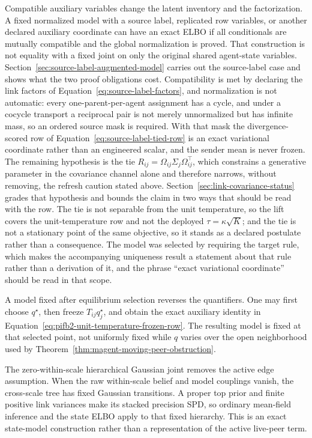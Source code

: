 Compatible auxiliary variables change the latent inventory and the factorization. A fixed normalized model with a source label, replicated row variables, or another declared auxiliary coordinate can have an exact ELBO if all conditionals are mutually compatible and the global normalization is proved. That construction is not equality with a fixed joint on only the original shared agent-state variables. Section~\ref{sec:source-label-augmented-model} carries out the source-label case and shows what the two proof obligations cost. Compatibility is met by declaring the link factors of Equation~\eqref{eq:source-label-factors}, and normalization is not automatic: every one-parent-per-agent assignment has a cycle, and under a cocycle transport a reciprocal pair is not merely unnormalized but has infinite mass, so an ordered source mask is required. With that mask the divergence-scored row of Equation~\eqref{eq:source-label-tied-row} is an exact variational coordinate rather than an engineered scalar, and the sender mean is never frozen. The remaining hypothesis is the tie \(R_{ij}=\Omega_{ij}\Sigma_j\Omega_{ij}^\top\), which constrains a generative parameter in the covariance channel alone and therefore narrows, without removing, the refresh caution stated above. Section~\ref{sec:link-covariance-status} grades that hypothesis and bounds the claim in two ways that should be read with the row. The tie is not separable from the unit temperature, so the lift covers the unit-temperature row and not the deployed \(\tau=\kappa\sqrt{K}\); and the tie is not a stationary point of the same objective, so it stands as a declared postulate rather than a consequence. The model was selected by requiring the target rule, which makes the accompanying uniqueness result a statement about that rule rather than a derivation of it, and the phrase ``exact variational coordinate'' should be read in that scope.

A model fixed after equilibrium selection reverses the quantifiers. One may first choose \(q^\star\), then freeze \(T_{ij}q_j^\star\), and obtain the exact auxiliary identity in Equation~\eqref{eq:pifb2-unit-temperature-frozen-row}. The resulting model is fixed at that selected point, not uniformly fixed while \(q\) varies over the open neighborhood used by Theorem~\ref{thm:magent-moving-peer-obstruction}.

The zero-within-scale hierarchical Gaussian joint removes the active edge assumption. When the raw within-scale belief and model couplings vanish, the cross-scale tree has fixed Gaussian transitions. A proper top prior and finite positive link variances make its stacked precision SPD, so ordinary mean-field inference and the state ELBO apply to that fixed hierarchy. This is an exact state-model construction rather than a representation of the active live-peer term.

